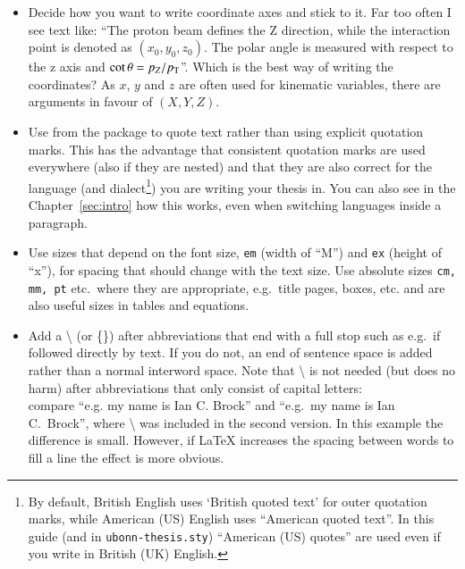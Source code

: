 \begin{itemize}
\item Decide how you want to write coordinate axes
  and stick to it. Far too often I see text like: \enquote{The proton
    beam defines the Z direction, while the interaction point is
    denoted as $(x_{0}, y_{0}, z_{0})$. The polar angle is measured
    with respect to the z axis and $\cot\theta = p_{Z}/p_{\text{T}}$}. Which is
  the best way of writing the coordinates? As $x$, $y$ and $z$ are
  often used for kinematic variables, there are arguments in favour of
  $(X, Y, Z)$.

\item Use  from the  package to
  quote text rather than using explicit quotation marks. This has the
  advantage that consistent quotation marks are used everywhere (also
  if they are nested) and that they are also correct for the language
  (and dialect\footnote{%
    By default, British English
    uses `British quoted text' for outer quotation marks,
    while American (US) English
    uses \foreignquote{USenglish}{American quoted text}. In this guide
    (and in \texttt{ubonn-thesis.sty})
    \foreignquote{USenglish}{American (US) quotes} are used even if you
    write in British (UK) English.})  you are writing your thesis in. You
  can also see in the Chapter~\ref{sec:intro} how this works, even
  when switching languages inside a paragraph.
\item Use sizes that depend on the font size, \texttt{em}
  (width of \enquote{M}) and \texttt{ex} (height of \enquote{x}), for
  spacing that should change with the text size. Use absolute sizes
  \texttt{cm, mm, pt} etc.\ where they are appropriate, e.g.\ title
  pages, boxes, etc.  and
   are also useful sizes in tables and
  equations.
\item Add a \textbackslash{} (or \{\}) after abbreviations that end with a full
  stop such as e.g.\ if followed directly by text. If you do not, an
  end of sentence space is added rather than a normal interword
  space. Note that \textbackslash{} is not needed (but does no harm)
  after abbreviations that only consist of capital letters:\\
  compare \enquote{e.g. my name is Ian C. Brock}
  and \enquote{e.g.\ my name is Ian C.\ Brock},
  where \textbackslash{} was included in the second version. In this
  example the difference is small. However, if \LaTeX{} increases the
  spacing between words to fill a line the effect is more obvious.

\end{itemize}
